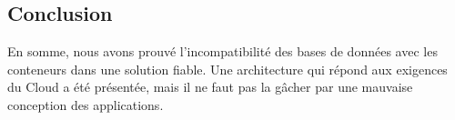 \begin{onehalfspace}
\section*{Conclusion}
En somme, nous avons prouvé l'incompatibilité des bases de données avec les conteneurs dans une solution fiable. Une architecture qui répond aux exigences du Cloud a été présentée, mais il ne faut pas la gâcher par une mauvaise conception des applications.

\end{onehalfspace}
